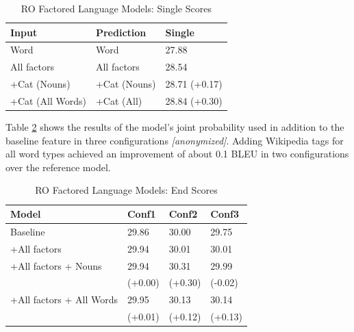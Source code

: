 \documentclass[a4paper]{article}
\newcommand{\anony}[1]{\textit{[anonymized]}}
\begin{document}

\begin{table}
\caption{RO Factored Language Models: Single Scores}
\centering
  \begin{tabular}{lll}
  	\hline
  	Input            & Prediction   & Single        \\ \hline\hline
  	Word             & Word         & 27.88         \\
  	All factors      & All factors  & 28.54         \\ \hline
  	+Cat (Nouns)     & +Cat (Nouns) & 28.71 (+0.17) \\
  	+Cat (All Words) & +Cat (All)   & 28.84 (+0.30)
  \end{tabular}
  \label{tb:ro-factored-single}
\end{table}

Table \ref{tb:ro-factored-combi} shows the results of the model's joint probability used in addition to the baseline feature in three configurations \anony{\cite{niehuesusing}}. 
Adding Wikipedia tags for all word types achieved an improvement of about 0.1 BLEU in two configurations over the reference model.

\begin{table}
\caption{RO Factored Language Models: End Scores}
\centering
  \begin{tabular}{llll}
  	\hline
  	Model                    & Conf1   & Conf2   & Conf3   \\ \hline\hline
  	Baseline                 & 29.86   & 30.00   & 29.75   \\
  	+All factors             & 29.94   & 30.01   & 30.01   \\ \hline
  	+All factors + Nouns     & 29.94   & 30.31   & 29.99   \\
  	                         & (+0.00) & (+0.30) & (-0.02) \\
  	+All factors + All Words & 29.95   & 30.13   & 30.14   \\
  	                         & (+0.01) & (+0.12) & (+0.13)
  \end{tabular}
  \label{tb:ro-factored-combi}
\end{table}
\end{document}
